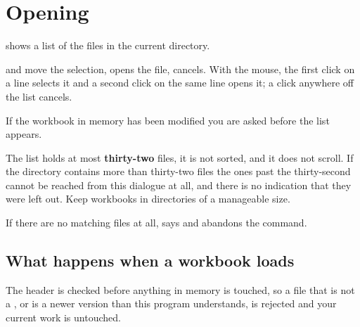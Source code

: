 \section{Opening}

 shows a list of the  files in the current directory.

\begin{ccfigure}
\caption{The file list, with the second entry selected}
\label{fig:filepicker}
\end{ccfigure}

\key{$\uparrow$} and \key{$\downarrow$} move the selection,  opens
the file,  cancels. With the mouse, the first click on a line selects
it and a second click on the same line opens it; a click anywhere off the list
cancels.

If the workbook in memory has been modified you are asked  before the list appears.

\begin{cccaution}
The list holds at most \textbf{thirty-two} files, it is not sorted, and it does
not scroll. If the directory contains more than thirty-two  files
the ones past the thirty-second cannot be reached from this dialogue at all,
and there is no indication that they were left out. Keep workbooks in
directories of a manageable size.
\end{cccaution}

If there are no matching files at all, \ccprod{} says  and abandons the command.

\subsection{What happens when a workbook loads}

The header is checked before anything in memory is touched, so a file that is
not a , or is a newer version than this program understands, is
rejected and your current work is untouched.

